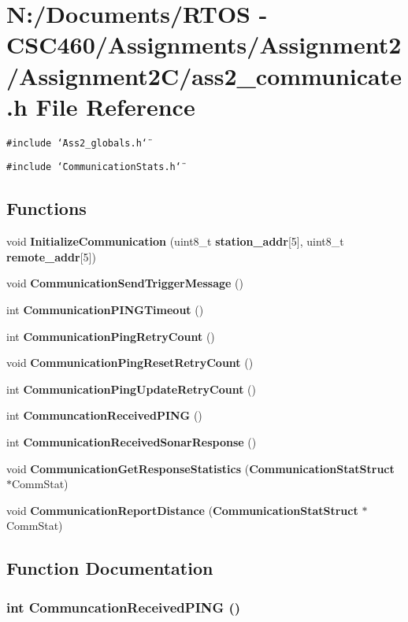 \section{N:/Documents/RTOS - CSC460/Assignments/Assignment2/Assignment2C/ass2\_\-communicate.h File Reference}
\label{ass2__communicate_8h}
{\tt \#include \char`\"{}Ass2\_\-globals.h\char`\"{}}\par
{\tt \#include \char`\"{}Communication\-Stats.h\char`\"{}}\par
\subsection*{Functions}
\begin{CompactItemize}
\item 
void {\bf Initialize\-Communication} (uint8\_\-t {\bf station\_\-addr}[5], uint8\_\-t {\bf remote\_\-addr}[5])
\item 
void {\bf Communication\-Send\-Trigger\-Message} ()
\item 
int {\bf Communication\-PINGTimeout} ()
\item 
int {\bf Communication\-Ping\-Retry\-Count} ()
\item 
void {\bf Communication\-Ping\-Reset\-Retry\-Count} ()
\item 
int {\bf Communication\-Ping\-Update\-Retry\-Count} ()
\item 
int {\bf Communcation\-Received\-PING} ()
\item 
int {\bf Communication\-Received\-Sonar\-Response} ()
\item 
void {\bf Communication\-Get\-Response\-Statistics} ({\bf Communication\-Stat\-Struct} $\ast$Comm\-Stat)
\item 
void {\bf Communication\-Report\-Distance} ({\bf Communication\-Stat\-Struct} $\ast$Comm\-Stat)
\end{CompactItemize}


\subsection{Function Documentation}
\subsubsection{\setlength{\rightskip}{0pt plus 5cm}int Communcation\-Received\-PING ()}\label{ass2__communicate_8h_4916e5a292337cfaceb4f364683ca263}


